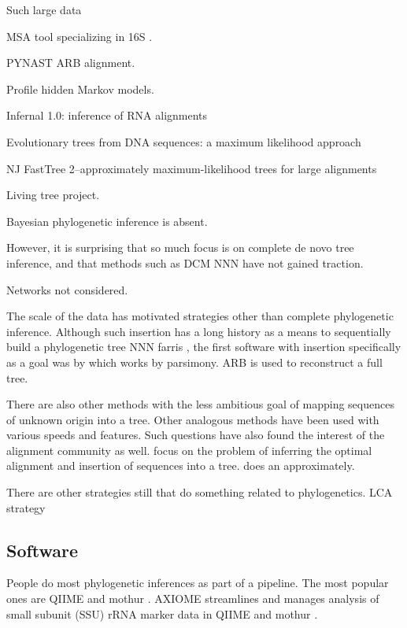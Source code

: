 \documentclass{amsart}
\begin{document}
Such large data

MSA tool specializing in 16S \cite{pruesse2012sina}.

PYNAST
ARB alignment.

\citep{eddy1998profile}
Profile hidden Markov models.

\citep{nawrocki2009infernal}
Infernal 1.0: inference of RNA alignments

\citep{felsenstein1981evolutionary}
{Evolutionary trees from DNA sequences: a maximum likelihood approach}

NJ
\citep{price2010fasttree}
{FastTree 2--approximately maximum-likelihood trees for large alignments}

Living tree project.

Bayesian phylogenetic inference is absent.

However, it is surprising that so much focus is on complete de novo tree inference, and that methods such as DCM NNN have not gained traction.

Networks not considered.

The scale of the data has motivated strategies other than complete phylogenetic inference.
Although such insertion has a long history as a means to sequentially build a phylogenetic tree NNN farris
, the first software with insertion specifically as a goal was by \citep{ludwig2004arb} which works by parsimony.
ARB is used to reconstruct a full tree.

There are also other methods with the less ambitious goal of mapping sequences of unknown origin into a tree.
Other analogous methods have been used \citep{wu2008simple,monierEaLargeViruses08,vonMeringEaQuantitative08,stark2010mltreemap,matsen2010pplacer,berger2011performance} with various speeds and features.
Such questions have also found the interest of the alignment community as well.
\citet{berger2011aligning} focus on the problem of inferring the optimal alignment and insertion of sequences into a tree.
\citet{mirarabsepp} does an approximately.

There are other strategies still that do something related to phylogenetics.
\citep{huson2007megan}
LCA strategy


\subsection{Software}

People do most phylogenetic inferences as part of a pipeline.
The most popular ones are QIIME \citep{caporaso2010qiime} and mothur \citep{schloss2009introducing}.
AXIOME streamlines and manages analysis of small subunit (SSU) rRNA marker data in QIIME and mothur \citep{lynch2013axiome}.
\end{document}
